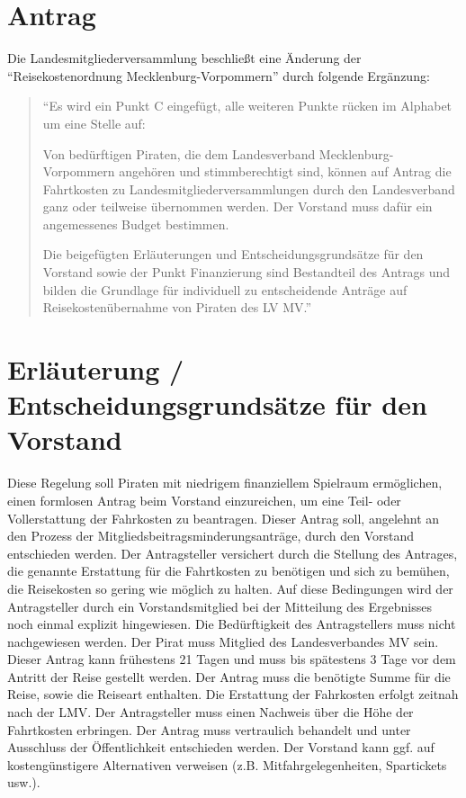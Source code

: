 \section{Antrag}

Die Landesmitgliederversammlung beschließt eine Änderung der ``Reisekostenordnung Mecklenburg-Vorpommern'' durch folgende Ergänzung:

\begin{quote}
``Es wird ein Punkt C eingefügt, alle weiteren Punkte rücken im Alphabet um eine Stelle auf:

Von bedürftigen Piraten, die dem Landesverband Mecklenburg-Vorpommern angehören und stimmberechtigt sind, können auf Antrag die Fahrtkosten zu Landesmitgliederversammlungen durch den Landesverband ganz oder teilweise übernommen werden. Der Vorstand muss dafür ein angemessenes Budget bestimmen.

Die beigefügten Erläuterungen und Entscheidungsgrundsätze für den Vorstand sowie der Punkt Finanzierung sind Bestandteil des Antrags und bilden die Grundlage für individuell zu entscheidende Anträge auf Reisekostenübernahme von Piraten des LV MV.''

\end{quote}
\section{Erläuterung / Entscheidungsgrundsätze für den Vorstand}

Diese Regelung soll Piraten mit niedrigem finanziellem Spielraum ermöglichen, einen formlosen Antrag beim Vorstand einzureichen, um eine Teil- oder Vollerstattung der Fahrkosten zu beantragen. Dieser Antrag soll, angelehnt an den Prozess der Mitgliedsbeitragsminderungsanträge, durch den Vorstand entschieden werden. Der Antragsteller versichert durch die Stellung des Antrages, die genannte Erstattung für die Fahrtkosten zu benötigen und sich zu bemühen, die Reisekosten so gering wie möglich zu halten. Auf diese Bedingungen wird der Antragsteller durch ein Vorstandsmitglied bei der Mitteilung des Ergebnisses noch einmal explizit hingewiesen. Die Bedürftigkeit des Antragstellers muss nicht nachgewiesen werden. Der Pirat muss Mitglied des Landesverbandes MV sein. Dieser Antrag kann frühestens 21 Tagen und muss bis spätestens 3 Tage vor dem Antritt der Reise gestellt werden. Der Antrag muss die benötigte Summe für die Reise, sowie die Reiseart enthalten. Die Erstattung der Fahrkosten erfolgt zeitnah nach der LMV. Der Antragsteller muss einen Nachweis über die Höhe der Fahrtkosten erbringen. Der Antrag muss vertraulich behandelt und unter Ausschluss der Öffentlichkeit entschieden werden. Der Vorstand kann ggf. auf kostengünstigere Alternativen verweisen (z.B. Mitfahrgelegenheiten, Spartickets usw.).

